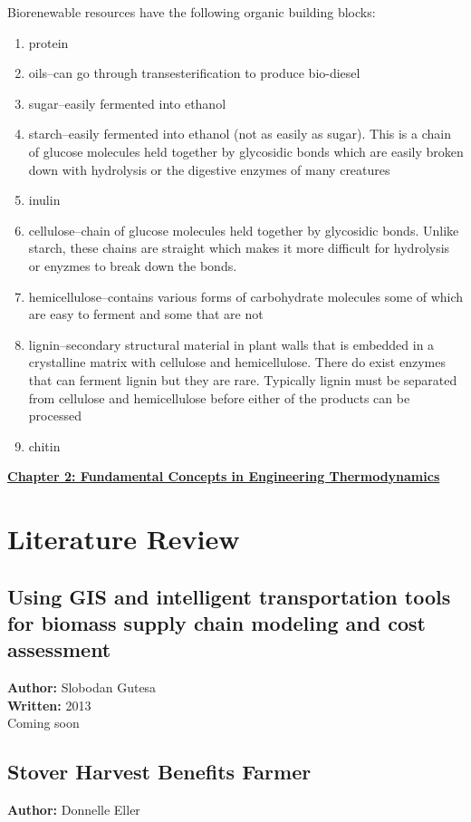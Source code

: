 \documentclass{article}\usepackage[]{graphicx}\usepackage[]{color}
\begin{document}
Biorenewable resources have the following organic building blocks: \\
\begin{enumerate}
\item protein
\item oils--can go through transesterification to produce bio-diesel
\item sugar--easily fermented into ethanol
\item starch--easily fermented into ethanol (not as easily as sugar).  This is a chain of glucose molecules held together by glycosidic bonds which are easily broken down with hydrolysis or the digestive enzymes of many creatures
\item inulin
\item cellulose--chain of glucose molecules held together by glycosidic bonds.  Unlike starch, these chains are straight which makes it more difficult for hydrolysis or enyzmes to break down the bonds.
\item hemicellulose--contains various forms of carbohydrate molecules some of which are easy to ferment and some that are not 
\item lignin--secondary structural material in plant walls that is embedded in a crystalline matrix with cellulose and hemicellulose.  There do exist enzymes that can ferment lignin but they are rare.  Typically lignin must be separated from cellulose and hemicellulose before either of the products can be processed
\item chitin
\end{enumerate}

\textbf{\underline{Chapter 2: Fundamental Concepts in Engineering Thermodynamics}} \\

\section{Literature Review}
\subsection{Using GIS and intelligent transportation tools for biomass supply chain modeling and cost assessment} 
\textbf{Author:} Slobodan Gutesa \\
\textbf{Written:} 2013 \\

Coming soon \\

\subsection{Stover Harvest Benefits Farmer}
\textbf{Author:} Donnelle Eller \\
\end{document}
